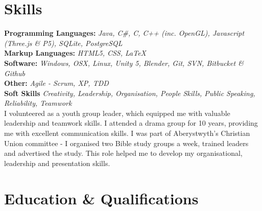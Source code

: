 \documentclass[10pt]{article} %
\begin{document}

\section{Skills}





\textbf{Programming Languages:} \textit{Java, C\#, C, C++ (inc. OpenGL), Javascript (Three.js \& P5), SQLite, PostgreSQL} \\ 

\textbf{Markup Languages:}\textit{ HTML5, CSS, \LaTeX} \\ 

\textbf{Software:} \textit{Windows, OSX, Linux, Unity 5, Blender, Git, SVN, Bitbucket \& Github}  \\

\textbf{Other:} \textit{Agile - Scrum, XP, TDD}\\ 

\textbf{Soft Skills} \newline
{}
\textit{Creativity, Leadership, Organisation, People Skills, Public Speaking, Reliability, Teamwork}\\
I volunteered as a youth group leader, which equipped me with valuable leadership and teamwork skills. I attended a drama group for 10 years, providing me with excellent communication skills. I was part of Aberystwyth's Christian Union committee - I organised two Bible study groups a week, trained leaders and advertised the study. This role helped me to develop my organisational, leadership and presentation skills.



\section{Education \& Qualifications}
\end{document}
